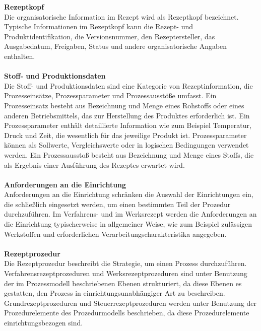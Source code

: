 \textbf{Rezeptkopf}\\
Die organisatorische Information im Rezept wird als Rezeptkopf bezeichnet. Typische Informationen im Rezeptkopf kann die Rezept- und Produktidentifikation, die Versionsnummer, den Rezeptersteller, das Ausgabedatum, Freigaben, Status und andere organisatorische Angaben enthalten.
\\\\
\textbf{Stoff- und Produktionsdaten}\\
Die Stoff- und Produktionsdaten sind eine Kategorie von Rezeptinformation, die Prozesseinsätze, Prozessparameter und Prozessausstöße umfasst.
Ein Prozesseinsatz besteht aus Bezeichnung und Menge eines Rohstoffs oder eines anderen Betriebsmittels, das zur Herstellung des Produktes erforderlich ist.
Ein Prozessparameter enthält detaillierte Information wie zum Beispiel Temperatur, Druck und Zeit, die wesentlich für das jeweilige Produkt ist.  Prozessparameter können als Sollwerte, Vergleichswerte oder in logischen Bedingungen verwendet werden.
Ein Prozessausstoß besteht aus Bezeichnung und Menge eines Stoffs, die als Ergebnis einer Ausführung des Rezeptes erwartet wird.
\\\\
\textbf{Anforderungen an die Einrichtung}\\
Anforderungen an die Einrichtung schränken die Auswahl der Einrichtungen ein, die schließlich eingesetzt werden, um einen bestimmten Teil der Prozedur durchzuführen. Im Verfahrens- und im Werksrezept werden die Anforderungen an die Einrichtung typischerweise in allgemeiner Weise, wie zum Beispiel zulässigen Werkstoffen und erforderlichen Verarbeitungscharakteristika angegeben.
\\\\
\textbf{Rezeptprozedur}\\
Die Rezeptprozedur beschreibt die Strategie, um einen Prozess durchzuführen. Verfahrensrezeptprozeduren und Werksrezeptprozeduren sind unter Benutzung der im Prozessmodell beschriebenen Ebenen strukturiert, da diese Ebenen es gestatten, den Prozess in einrichtungsunabhängiger Art zu beschreiben. Grundrezeptprozeduren und Steuerrezeptprozeduren werden unter Benutzung der Prozedurelemente des Prozedurmodells beschrieben, da diese Prozedurelemente einrichtungsbezogen sind.\\
\cite{en61512}

